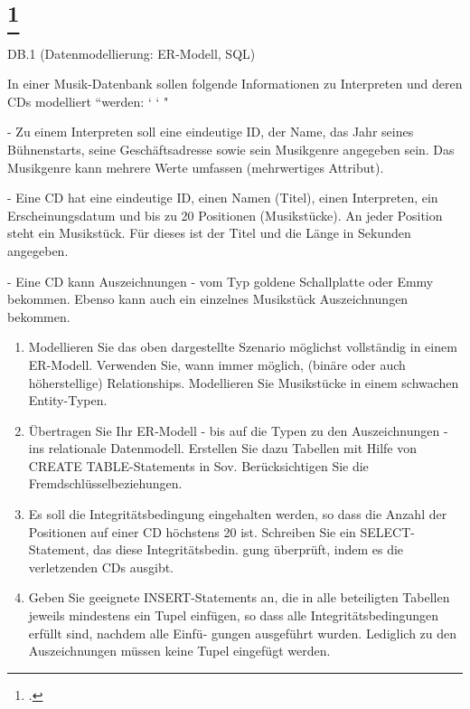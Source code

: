 \documentclass{lehramt-informatik-aufgabe}
\begin{document}
\liAufgabenTitel{}
\section{
\footcite{66116:2015:03}}

DB.1 (Datenmodellierung: ER-Modell, SQL)

In einer Musik-Datenbank sollen folgende Informationen zu Interpreten und deren CDs modelliert
“werden: ‘ ‘ "

- Zu einem Interpreten soll eine eindeutige ID, der Name, das Jahr seines Bühnenstarts, seine Geschäftsadresse sowie sein Musikgenre angegeben sein. Das Musikgenre kann mehrere Werte umfassen (mehrwertiges Attribut).

- Eine CD hat eine eindeutige ID, einen Namen (Titel), einen Interpreten, ein Erscheinungsdatum
und bis zu 20 Positionen (Musikstücke). An jeder Position steht ein Musikstück. Für dieses ist der
Titel und die Länge in Sekunden angegeben.

- Eine CD kann Auszeichnungen - \zB vom Typ goldene Schallplatte oder Emmy bekommen.
Ebenso kann auch ein einzelnes Musikstück Auszeichnungen bekommen.

\begin{enumerate}


\item  Modellieren Sie das oben dargestellte Szenario möglichst
vollständig in einem ER-Modell. Verwenden Sie, wann immer möglich,
(binäre oder auch höherstellige) Relationships. Modellieren Sie
Musikstücke in einem schwachen Entity-Typen.


\item Übertragen Sie Ihr ER-Modell - bis auf die Typen zu den
Auszeichnungen - ins relationale Datenmodell. Erstellen Sie dazu
Tabellen mit Hilfe von CREATE TABLE-Statements in Sov. Berücksichtigen
Sie die Fremdschlüsselbeziehungen.


\item Es soll die Integritätsbedingung eingehalten werden, so dass die
Anzahl der Positionen auf einer CD höchstens 20 ist. Schreiben Sie ein
SELECT-Statement, das diese Integritätsbedin. gung überprüft, indem es
die verletzenden CDs ausgibt.


\item Geben Sie geeignete INSERT-Statements an, die in alle beteiligten
Tabellen jeweils mindestens ein Tupel einfügen, so dass alle
Integritätsbedingungen erfüllt sind, nachdem alle Einfü- gungen
ausgeführt wurden. Lediglich zu den Auszeichnungen müssen keine Tupel
eingefügt werden.
\end{enumerate}
\end{document}
